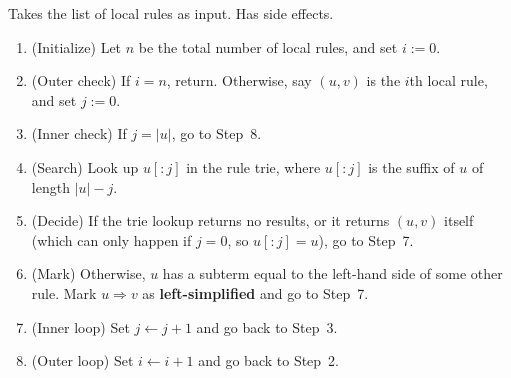 \documentclass[../generics]{subfiles}
\begin{document}
\begin{algorithm}\label{left simplification}
Takes the list of local rules as input. Has side effects.
\begin{enumerate}
\item (Initialize) Let $n$ be the total number of local rules, and set $i:=0$.
\item (Outer check) If $i=n$, return. Otherwise, say $(u, v)$ is the $i$th local rule, and set $j:=0$.
\item (Inner check) If $j=|u|$, go to Step~8.
\item (Search) Look up $u[:j]$ in the rule trie, where $u[:j]$ is the suffix of $u$ of length $|u|-j$.
\item (Decide) If the trie lookup returns no results, or it returns $(u, v)$ itself (which can only happen if $j=0$, so $u[:j]=u$), go to Step~7.
\item (Mark) Otherwise, $u$ has a subterm equal to the left-hand side of some other rule. Mark $u\Rightarrow v$ as \textbf{left-simplified} and go to Step~7.
\item (Inner loop) Set $j\leftarrow j+1$ and go back to Step~3.
\item (Outer loop) Set $i\leftarrow i+1$ and go back to Step~2.
\end{enumerate}
\end{algorithm}
\end{document}
